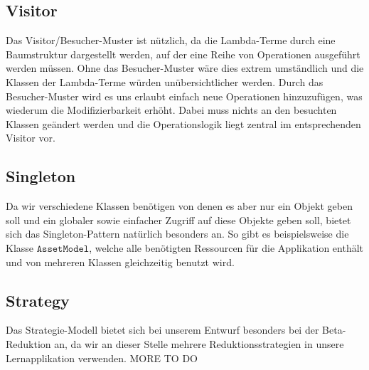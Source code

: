 \subsection{Visitor}
Das Visitor/Besucher-Muster ist nützlich, da die Lambda-Terme durch eine Baumstruktur dargestellt werden, auf der eine Reihe von Operationen
ausgeführt werden müssen. Ohne das Besucher-Muster wäre dies extrem umständlich und die Klassen der Lambda-Terme würden unübersichtlicher
werden. Durch das Besucher-Muster wird es uns erlaubt einfach neue Operationen hinzuzufügen, was wiederum die Modifizierbarkeit erhöht.
Dabei muss nichts an den besuchten Klassen geändert werden und die Operationslogik liegt zentral im entsprechenden Visitor vor.

\subsection{Singleton}
Da wir verschiedene Klassen benötigen von denen es aber nur ein Objekt geben soll und ein globaler sowie einfacher Zugriff auf diese Objekte geben soll, bietet sich das Singleton-Pattern natürlich besonders an. So gibt es beispielsweise die Klasse $\texttt{AssetModel}$, welche alle benötigten Ressourcen für die Applikation enthält und von mehreren Klassen gleichzeitig benutzt wird.

\subsection{Strategy}
Das Strategie-Modell bietet sich bei unserem Entwurf besonders bei der Beta-Reduktion an, da wir an dieser Stelle mehrere Reduktionsstrategien in unsere Lernapplikation verwenden.
MORE TO DO
